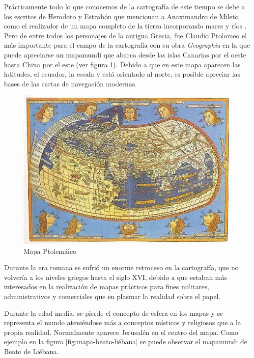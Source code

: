 Prácticamente todo lo que conocemos de la cartografía de este tiempo se debe a los escritos de Herodoto y Estrabón que mencionan a Anaximandro de Mileto como el realizador de un mapa completo de la tierra incorporando mares y ríos \cite{Kap10}. Pero de entre todos los personajes de la antigua Grecia, fue Claudio Ptolomeo el más importante para el campo de la cartografía con su obra \textit{Geographia} en la que puede apreciarse un mapamundi que abarca desde las islas Canarias por el oeste hasta China por el este (ver figura \ref{fig:mapa-ptolomeo}). Debido a que en este mapa aparecen las latitudes, el ecuador, la escala y está orientado al norte, es posible apreciar las bases de las cartas de navegación modernas.

\begin{figure}[h!btp]
\centering
\includegraphics[width=120mm, fbox={\fboxrule} 0mm]{images/03-antecedentes/33-mapa_ptolomeo.jpg}
\caption{Mapa Ptolemáico}
\label{fig:mapa-ptolomeo}
\end{figure}

Durante la era romana se sufrió un enorme retroceso en la cartografía, que no volvería a los niveles griegos hasta el siglo XVI, debido a que estaban más interesados en la realización de mapas prácticos para fines militares, administrativos y comerciales que en plasmar la realidad sobre el papel.

Durante la edad media, se pierde el concepto de esfera en los mapas y se representa el mundo ateniéndose más a conceptos místicos y religiosos que a la propia realidad. Normalmente aparece Jerusalén en el centro del mapa. Como ejemplo en la figura \ref{fig:mapa-beato-liébana} se puede observar el mapamundi de Beato de Liébana.


